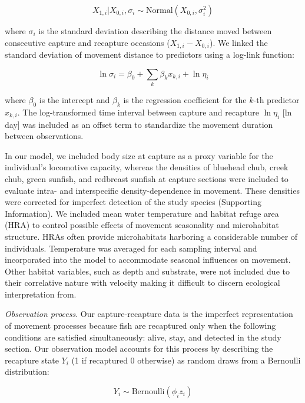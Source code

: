 \documentclass[11pt, class=article, crop=false]{standalone}
\begin{document}
\begin{equation}
    X_{1, i}|X_{0, i}, \sigma_i \sim \text{Normal}(X_{0, i}, \sigma_i^2)
    \label{eq:normal}
\end{equation}

where $\sigma_i$ is the standard deviation describing the distance moved between consecutive capture and recapture occasions ($X_{1,i} - X_{0,i}$).
We linked the standard deviation of  movement distance to predictors using a log-link function: 

\begin{equation}
    \ln \sigma_i = \beta_0 + \sum_{k} \beta_k x_{k,i} + \ln \eta_i
    \label{eq:linear-pred}
\end{equation}

where $\beta_0$ is the intercept and $\beta_k$ is the regression coefficient for the $k$-th predictor $x_{k,i}$. The log-transformed time interval between capture and recapture $\ln \eta_i$ [ln day] was included as an offset term to standardize the movement duration between observations.

In our model, we included body size at capture as a proxy variable for the individual’s locomotive capacity, whereas the densities of bluehead chub, creek chub, green sunfish, and redbreast sunfish at capture sections were included to evaluate intra- and interspecific density-dependence in movement. These densities were corrected for imperfect detection of the study species (Supporting Information). We included mean water temperature and habitat refuge area (HRA) to control possible effects of movement seasonality and microhabitat structure. HRAs often provide microhabitats harboring a considerable number of individuals. Temperature was averaged for each sampling interval and incorporated into the model to accommodate seasonal influences on movement. Other habitat variables, such as depth and substrate, were not included due to their correlative nature with velocity making it difficult to discern ecological interpretation from. 

\textit{Observation process}. Our capture-recapture data is the imperfect representation of movement processes because fish are recaptured only when the following conditions are satisfied simultaneously: alive, stay, and detected in the study section. Our observation model accounts for this process by describing the recapture state $Y_i$ (1 if recaptured 0 otherwise) as random draws from a Bernoulli distribution:

\begin{equation}
    Y_i \sim \text{Bernoulli}(\phi_i z_i)
\end{equation}
\end{document}
